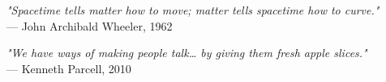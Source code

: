 \begin{flushright}
\emph{"Spacetime tells matter how to move; matter tells spacetime how to curve."}\\
— John Archibald Wheeler, 1962
\end{flushright}
\vspace{2em}
\begin{flushright}
\emph{"We have ways of making people talk… by giving them fresh apple slices."}\\
— Kenneth Parcell, 2010
\end{flushright}
